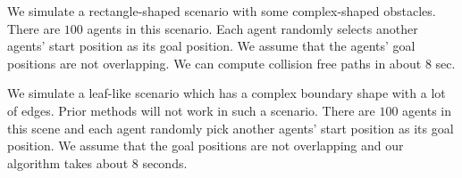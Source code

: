  We simulate a rectangle-shaped scenario with some complex-shaped obstacles. 
There are $100$ agents in this scenario. Each agent randomly selects another agents' start position as its goal position. We assume that the agents' goal positions are not overlapping. We can compute collision free paths in about $8$ sec.

We simulate a leaf-like scenario which has a complex boundary shape with a lot of edges. Prior methods will not work in such a scenario. %
There are $100$ agents in this scene and each agent randomly pick another agents' start position as its goal position. We assume that the goal positions are not overlapping and our algorithm takes about $8$ seconds.

